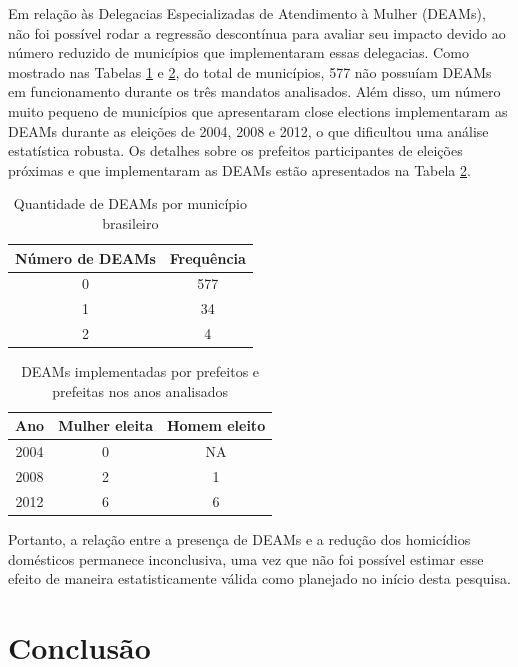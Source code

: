 Em relação às Delegacias Especializadas de Atendimento à Mulher (DEAMs), não foi possível rodar a regressão descontínua para avaliar seu impacto devido ao número reduzido de municípios que implementaram essas delegacias. Como mostrado nas Tabelas \ref{tab:deam_freq} e \ref{tab:distribuicao_genero_ano}, do total de municípios, 577 não possuíam DEAMs em funcionamento durante os três mandatos analisados. Além disso, um número muito pequeno de municípios que apresentaram close elections implementaram as DEAMs durante as eleições de 2004, 2008 e 2012, o que dificultou uma análise estatística robusta. Os detalhes sobre os prefeitos participantes de eleições próximas e que implementaram as DEAMs estão apresentados na Tabela \ref{tab:distribuicao_genero_ano}.

\begin{table}[h]
    \centering
    \begin{tabular}{cc}
        \toprule
        \textbf{Número de DEAMs} & \textbf{Frequência} \\
        \midrule
        0 & 577 \\
        1 & 34 \\
        2 & 4 \\
        \bottomrule
    \end{tabular}
    \caption{Quantidade de DEAMs por município brasileiro}
    \label{tab:deam_freq}
\end{table}


\begin{table}[h]
    \centering
    \begin{tabular}{ccc}
        \toprule
        \textbf{Ano} & \textbf{Mulher eleita} & \textbf{Homem eleito} \\
        \midrule
        2004 & 0 & NA \\
        2008 & 2 & 1 \\
        2012 & 6 & 6 \\
        \bottomrule
    \end{tabular}
    \caption{DEAMs implementadas por prefeitos e prefeitas nos anos analisados}
    \label{tab:distribuicao_genero_ano}
\end{table}


Portanto, a relação entre a presença de DEAMs e a redução dos homicídios domésticos permanece inconclusiva, uma vez que não foi possível estimar esse efeito de maneira estatisticamente válida como planejado no início desta pesquisa.

\section{Conclusão}

